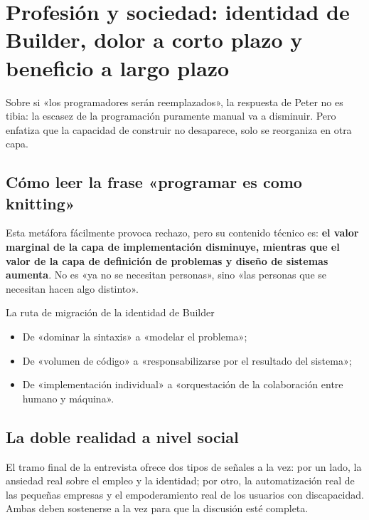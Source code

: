 \section{Profesión y sociedad: identidad de Builder, dolor a corto plazo y beneficio a largo plazo}

Sobre si «los programadores serán reemplazados», la respuesta de Peter no es tibia: la escasez de la programación puramente manual va a disminuir. Pero enfatiza que la capacidad de construir no desaparece, solo se reorganiza en otra capa.

\subsection{Cómo leer la frase «programar es como knitting»}

Esta metáfora fácilmente provoca rechazo, pero su contenido técnico es: \textbf{el valor marginal de la capa de implementación disminuye, mientras que el valor de la capa de definición de problemas y diseño de sistemas aumenta}. No es «ya no se necesitan personas», sino «las personas que se necesitan hacen algo distinto».

\begin{knowledgebox}{La ruta de migración de la identidad de Builder}
\begin{itemize}
    \item De «dominar la sintaxis» a «modelar el problema»;
    \item De «volumen de código» a «responsabilizarse por el resultado del sistema»;
    \item De «implementación individual» a «orquestación de la colaboración entre humano y máquina».
\end{itemize}
\end{knowledgebox}

\subsection{La doble realidad a nivel social}

El tramo final de la entrevista ofrece dos tipos de señales a la vez: por un lado, la ansiedad real sobre el empleo y la identidad; por otro, la automatización real de las pequeñas empresas y el empoderamiento real de los usuarios con discapacidad. Ambas deben sostenerse a la vez para que la discusión esté completa.

